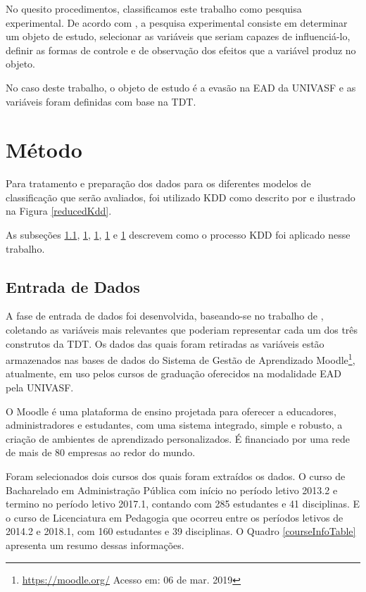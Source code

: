 No quesito procedimentos, classificamos este trabalho como pesquisa
experimental. De acordo com , a pesquisa
experimental consiste em determinar um objeto de estudo, selecionar as variáveis
que seriam capazes de influenciá-lo, definir as formas de controle e de
observação dos efeitos que a variável produz no objeto.

No caso deste trabalho, o objeto de estudo é a evasão na EAD da UNIVASF e as
variáveis foram definidas com base na TDT.

\section{Método}

Para tratamento e preparação dos dados para os diferentes modelos de
classificação que serão avaliados, foi utilizado KDD como descrito por
 e ilustrado na Figura \ref{reducedKdd}.


As subseções \ref{dataEntrySection}, \ref{}, \ref{}, \ref{} e \ref{} descrevem
como o processo KDD foi aplicado nesse trabalho.

\subsection{Entrada de Dados}
\label{dataEntrySection}

A fase de entrada de dados foi desenvolvida, baseando-se no trabalho de
, coletando as variáveis mais relevantes que
poderiam representar cada um dos três construtos da TDT. Os dados das quais
foram retiradas as variáveis estão armazenados nas bases de dados do Sistema de
Gestão de Aprendizado Moodle\footnote{\url{https://moodle.org/} Acesso em: 06 de
mar. 2019}, atualmente, em uso pelos cursos de graduação oferecidos na
modalidade EAD pela UNIVASF.

O Moodle é uma plataforma de ensino projetada para oferecer a educadores,
administradores e estudantes, com uma sistema integrado, simple e robusto, a
criação de ambientes de aprendizado personalizados. É financiado por uma rede de
mais de 80 empresas ao redor do mundo.

Foram selecionados dois cursos dos quais foram extraídos os dados. O curso de
Bacharelado em Administração Pública com início no período letivo 2013.2 e
termino no período letivo 2017.1, contando com 285 estudantes e 41 disciplinas.
E o curso de Licenciatura em Pedagogia que ocorreu entre os períodos letivos de
2014.2 e 2018.1, com 160 estudantes e 39 disciplinas. O Quadro
\ref{courseInfoTable} apresenta um resumo dessas informações.

